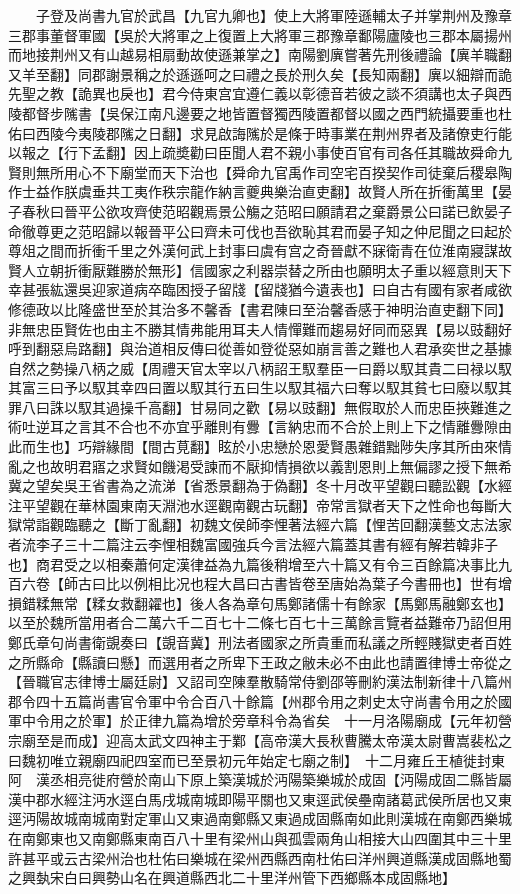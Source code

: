 　　子登及尚書九官於武昌【九官九卿也】使上大將軍陸遜輔太子并掌荆州及豫章三郡事董督軍國【吳於大將軍之上復置上大將軍三郡豫章鄱陽廬陵也三郡本屬揚州而地接荆州又有山越易相扇動故使遜兼掌之】南陽劉廙嘗著先刑後禮論【廙羊職翻又羊至翻】同郡謝景稱之於遜遜呵之曰禮之長於刑久矣【長知兩翻】廙以細辯而詭先聖之教【詭異也戾也】君今侍東宫宜遵仁義以彰德音若彼之談不須講也太子與西陵都督步隲書【吳保江南凡邊要之地皆置督獨西陵置都督以國之西門統攝要重也杜佑曰西陵今夷陵郡隲之日翻】求見啟誨隲於是條于時事業在荆州界者及諸僚吏行能以報之【行下孟翻】因上疏奬勸曰臣聞人君不親小事使百官有司各任其職故舜命九賢則無所用心不下廟堂而天下治也【舜命九官禹作司空宅百揆契作司徒棄后稷皋陶作士益作朕虞垂共工夷作秩宗龍作納言夔典樂治直吏翻】故賢人所在折衝萬里【晏子春秋曰晉平公欲攻齊使范昭觀焉景公觴之范昭曰願請君之棄爵景公曰諾已飲晏子命徹尊更之范昭歸以報晉平公曰齊未可伐也吾欲恥其君而晏子知之仲尼聞之曰起於尊俎之間而折衝千里之外漢何武上封事曰虞有宫之奇晉獻不寐衛青在位淮南寢謀故賢人立朝折衝厭難勝於無形】信國家之利器崇替之所由也願明太子重以經意則天下幸甚張紘還吳迎家道病卒臨困授子留牋【留牋猶今遺表也】曰自古有國有家者咸欲修德政以比隆盛世至於其治多不馨香【書君陳曰至治馨香感于神明治直吏翻下同】非無忠臣賢佐也由主不勝其情弗能用耳夫人情憚難而趨易好同而惡異【易以豉翻好呼到翻惡烏路翻】與治道相反傳曰從善如登從惡如崩言善之難也人君承奕世之基據自然之勢操八柄之威【周禮天官太宰以八柄詔王馭羣臣一曰爵以馭其貴二曰禄以馭其富三曰予以馭其幸四曰置以馭其行五曰生以馭其福六曰奪以馭其貧七曰廢以馭其罪八曰誅以馭其過操千高翻】甘易同之歡【易以豉翻】無假取於人而忠臣挾難進之術吐逆耳之言其不合也不亦宜乎離則有釁【言納忠而不合於上則上下之情離釁隙由此而生也】巧辯緣間【間古莧翻】眩於小忠戀於恩愛賢愚雜錯黜陟失序其所由來情亂之也故明君寤之求賢如饑渇受諫而不厭抑情損欲以義割恩則上無偏謬之授下無希冀之望矣吳王省書為之流涕【省悉景翻為于偽翻】冬十月改平望觀曰聽訟觀【水經注平望觀在華林園東南天淵池水逕觀南觀古玩翻】帝常言獄者天下之性命也每斷大獄常詣觀臨聽之【斷丁亂翻】初魏文侯師李悝著法經六篇【悝苦回翻漢藝文志法家者流李子三十二篇注云李悝相魏富國強兵今言法經六篇蓋其書有經有解若韓非子也】商君受之以相秦蕭何定漢律益為九篇後稍增至六十篇又有令三百餘篇决事比九百六卷【師古曰比以例相比况也程大昌曰古書皆卷至唐始為葉子今書冊也】世有增損錯糅無常【糅女救翻糴也】後人各為章句馬鄭諸儒十有餘家【馬鄭馬融鄭玄也】以至於魏所當用者合二萬六千二百七十二條七百七十三萬餘言覽者益難帝乃詔但用鄭氏章句尚書衛覬奏曰【覬音冀】刑法者國家之所貴重而私議之所輕賤獄吏者百姓之所縣命【縣讀曰懸】而選用者之所卑下王政之敝未必不由此也請置律博士帝從之【晉職官志律博士屬廷尉】又詔司空陳羣散騎常侍劉邵等刪約漢法制新律十八篇州郡令四十五篇尚書官令軍中令合百八十餘篇【州郡令用之刺史太守尚書令用之於國軍中令用之於軍】於正律九篇為增於旁章科令為省矣　十一月洛陽廟成【元年初營宗廟至是而成】迎高太武文四神主于鄴【高帝漢大長秋曹騰太帝漢太尉曹嵩裴松之曰魏初唯立親廟四祀四室而已至景初元年始定七廟之制】　十二月雍丘王植徙封東阿　漢丞相亮徙府營於南山下原上築漢城於沔陽築樂城於成固【沔陽成固二縣皆屬漢中郡水經注沔水逕白馬戌城南城即陽平關也又東逕武侯壘南諸葛武侯所居也又東逕沔陽故城南城南對定軍山又東過南鄭縣又東過成固縣南如此則漢城在南鄭西樂城在南鄭東也又南鄭縣東南百八十里有梁州山與孤雲兩角山相接大山四圍其中三十里許甚平或云古梁州治也杜佑曰樂城在梁州西縣西南杜佑曰洋州興道縣漢成固縣地蜀之興埶宋白曰興勢山名在興道縣西北二十里洋州管下西鄉縣本成固縣地】

